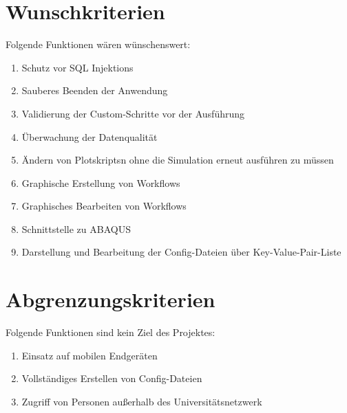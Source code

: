 \section{Wunschkriterien}
Folgende Funktionen wären wünschenswert:
\renewcommand{\labelenumi}{/W\arabic{enumi}0/}
\begin{enumerate}
    \setlength\itemsep{-1em}
    \item Schutz vor \gls{SQL} \glspl{Injektion}
    \item Sauberes Beenden der Anwendung
    \item Validierung der Custom-Schritte vor der Ausführung
    \item Überwachung der Datenqualität
    \item Ändern von \glspl{Plotskript}n ohne die Simulation erneut ausführen zu müssen
    \item Graphische Erstellung von Workflows
    \item Graphisches Bearbeiten von Workflows
    \item Schnittstelle zu \gls{ABAQUS}
    \item Darstellung und Bearbeitung der Config-Dateien über \gls{Key-Value-Pair}-Liste
\end{enumerate}

\section{Abgrenzungskriterien}
Folgende Funktionen sind kein Ziel des Projektes:
\renewcommand{\labelenumi}{/A\arabic{enumi}0/}
\begin{enumerate}
    \setlength\itemsep{-1em}
    \item Einsatz auf mobilen Endgeräten
    \item Vollständiges Erstellen von Config-Dateien
    \item Zugriff von Personen außerhalb des Universitätsnetzwerk
\end{enumerate}
\renewcommand{\labelenumi}{\arabic{enumi}}